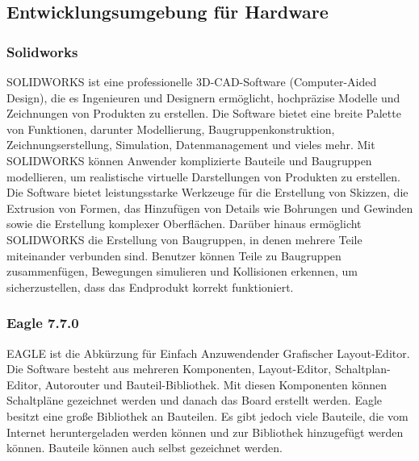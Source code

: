 \subsection{Entwicklungsumgebung für Hardware}
\SecAuth{\nameJS / \nameSH}
\subsubsection{Solidworks\autocite{SOLIDWORKS}}\label{sec:solidworks}
\begin{figwindow}
SOLIDWORKS ist eine professionelle 3D-CAD-Software (Computer-Aided Design), die es Ingenieuren und Designern ermöglicht, hochpräzise Modelle und Zeichnungen von Produkten zu erstellen. Die Software bietet eine breite Palette von Funktionen, darunter Modellierung, Baugruppenkonstruktion, Zeichnungserstellung, Simulation, Datenmanagement und vieles mehr.
Mit SOLIDWORKS können Anwender komplizierte Bauteile und Baugruppen modellieren, um realistische virtuelle Darstellungen von Produkten zu erstellen. Die Software bietet leistungsstarke Werkzeuge für die Erstellung von Skizzen, die Extrusion von Formen, das Hinzufügen von Details wie Bohrungen und Gewinden sowie die Erstellung komplexer Oberflächen.
Darüber hinaus ermöglicht SOLIDWORKS die Erstellung von Baugruppen, in denen mehrere Teile miteinander verbunden sind. Benutzer können Teile zu Baugruppen zusammenfügen, Bewegungen simulieren und Kollisionen erkennen, um sicherzustellen, dass das Endprodukt korrekt funktioniert.
\end{figwindow}
\vspace{3mm}
\subsubsection{Eagle 7.7.0}\label{sec:Eagle}
\begin{figwindow}
EAGLE\autocite{Eagle} ist die Abkürzung für Einfach Anzuwendender Grafischer Layout-Editor. Die Software besteht aus mehreren Komponenten, Layout-Editor, Schaltplan-Editor, Autorouter und Bauteil-Bibliothek. Mit diesen Komponenten können Schaltpläne gezeichnet werden und danach das Board erstellt werden. Eagle besitzt eine große Bibliothek an Bauteilen. Es gibt jedoch viele Bauteile, die vom Internet heruntergeladen werden können und zur Bibliothek hinzugefügt werden können. Bauteile können auch selbst gezeichnet werden.
\end{figwindow}